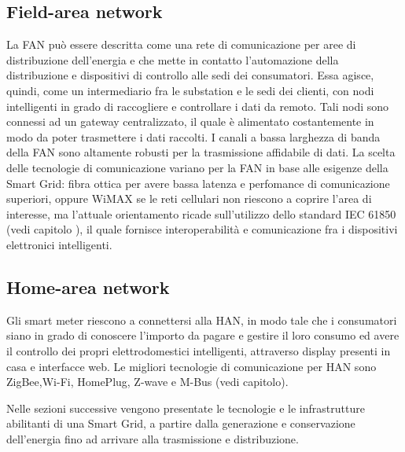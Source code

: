 \subsection{Field-area network}
La FAN può essere descritta come una rete di comunicazione per aree di distribuzione dell'energia e che mette in contatto l'automazione della distribuzione e dispositivi di controllo alle sedi dei consumatori. Essa agisce, quindi, come un intermediario fra le substation e le sedi dei clienti, con nodi intelligenti in grado di raccogliere e controllare i dati da remoto. Tali nodi sono connessi ad un gateway centralizzato, il quale è alimentato costantemente in modo da poter trasmettere i dati raccolti. I canali a bassa larghezza di banda della FAN sono altamente robusti per la trasmissione affidabile di dati. 
\newline 
La scelta delle tecnologie di comunicazione  variano per la FAN in base alle esigenze della Smart Grid: fibra ottica per avere bassa latenza e perfomance di comunicazione superiori, oppure WiMAX se le reti cellulari non riescono a coprire l'area di interesse, ma l'attuale orientamento ricade sull'utilizzo dello standard IEC 61850 (vedi capitolo ), il quale fornisce interoperabilità e comunicazione fra i dispositivi elettronici intelligenti.

\subsection{Home-area network}{
Gli smart meter riescono a connettersi alla HAN, in modo tale che i consumatori siano in grado di conoscere l'importo da pagare e gestire il loro consumo ed avere il controllo dei propri elettrodomestici intelligenti, attraverso display presenti in casa e interfacce web. 
\newline 
Le migliori tecnologie di comunicazione per HAN sono ZigBee,Wi-Fi, HomePlug, Z-wave e M-Bus (vedi capitolo).
}

\vspace{20pt}\hspace{-17pt}Nelle sezioni successive vengono presentate le tecnologie e le infrastrutture abilitanti di una Smart Grid, a partire dalla generazione e conservazione dell'energia fino ad arrivare alla trasmissione e distribuzione.

